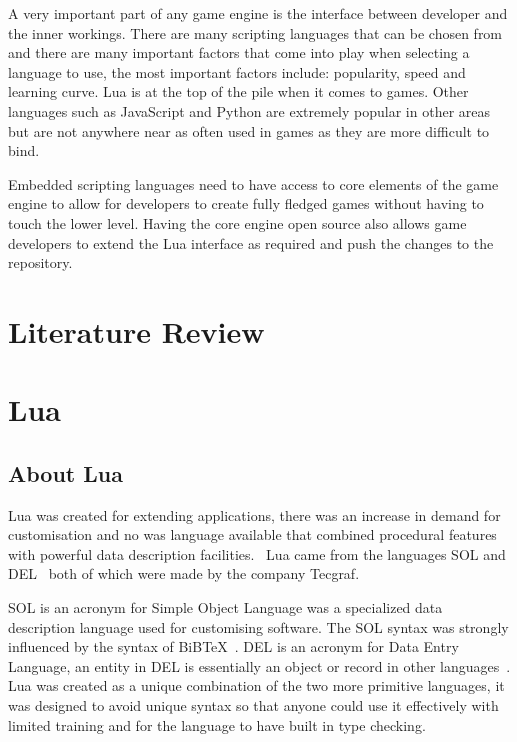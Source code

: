 \documentclass[11pt,a4paper,titlepage]{article}
\begin{document}
		A very important part of any game engine is the interface between developer and the inner workings. There are many scripting languages that can be chosen from and there are many important factors that come into play when selecting a language to use, the most important factors include: popularity, speed and learning curve. Lua is at the top of the pile when it comes to games. Other languages such as JavaScript and Python are extremely popular in other areas but are not anywhere near as often used in games as they are more difficult to bind.
					
		Embedded scripting languages need to have access to core elements of the game engine to allow for developers to create fully fledged games without having to touch the lower level. Having the core engine open source also allows game developers to extend the Lua interface as required and push the changes to the repository.
		
	\newpage










	
	\section{Literature Review}

	\section{Lua}
		\subsection{About Lua}
			Lua was created for extending applications, there was an increase in demand for customisation and no was language available that combined procedural features with powerful data description facilities.~\cite{Ierusalimschy02software} Lua came from the languages SOL and DEL~\cite{Ierusalimschy01theevolution} both of which were made by the company Tecgraf.
			
			SOL is an acronym for Simple Object Language was a specialized data description language used for customising software. The SOL syntax was strongly influenced by the syntax of BiBTeX~\cite{Lamport:1989:LDP:63364}. DEL is an acronym for Data Entry Language, an entity in DEL is essentially an object or record in other languages~\cite{Ierusalimschy01theevolution}. Lua was created as a unique combination of the two more primitive languages, it was designed to avoid unique syntax so that anyone could use it effectively with limited training and for the language to have built in type checking.
			
\end{document}
